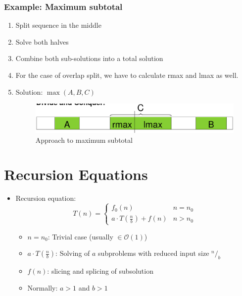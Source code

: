 \documentclass[12pt, a4paper]{scrartcl}
\newcommand{\bigO}{\mathcal{O}}
\newcommand{\imgwidth}{.7\textwidth}
\begin{document}
\subsubsection{Example: Maximum subtotal}
\label{sec:O-notation}
\begin{enumerate}
\item Split sequence in the middle
\item Solve both halves
\item Combine both sub-solutions into a total solution
\item For the case of overlap split, we have to calculate \textrm{rmax} and \textrm{lmax} as well.
\item Solution: $\max(A,B,C)$
  \begin{figure}[htbp]
    \centering
  \includegraphics[width=\imgwidth]{maximum_subtotal}
  \caption{Approach to maximum subtotal}
  \label{fig:maximum_subtotal}
\end{figure}
\end{enumerate}

\section{Recursion Equations}
\label{sec:recursion_equations}
\begin{itemize}
\item Recursion equation:
  \begin{equation}
    \label{eq:recursion_equation}
    T(n)=
    \left\{
      \begin{array}{ll}
        f_0(n)&n=n_0\\
        a\cdot T\left(\frac{n}{b}\right)+f(n)&n>n_0
      \end{array}
    \right.
  \end{equation}
  \begin{itemize}
  \item $n=n_0$: Trivial case (usually $\in\bigO(1)$)
  \item $a\cdot T\left(\frac{n}{b}\right)$: Solving of $a$ subproblems with reduced input size $^n/_b$
  \item $f(n)$: slicing and splicing of subsolution
  \item Normally: $a>1$ and $b>1$
  \end{itemize}
\end{itemize}
\end{document}
